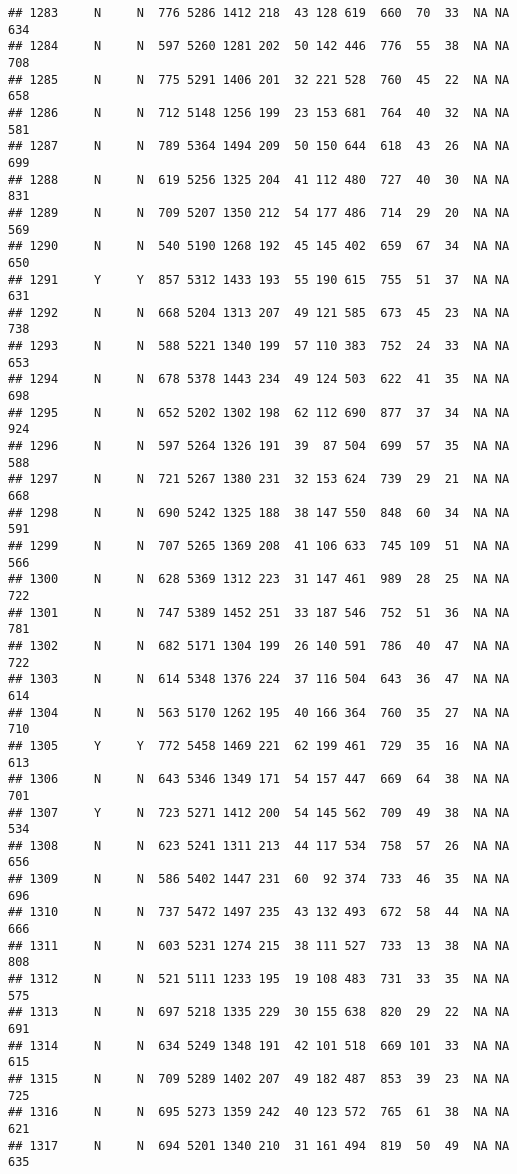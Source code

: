 \documentclass[]{article}
\begin{document}
\begin{verbatim}
## 1283     N     N  776 5286 1412 218  43 128 619  660  70  33  NA NA  634
## 1284     N     N  597 5260 1281 202  50 142 446  776  55  38  NA NA  708
## 1285     N     N  775 5291 1406 201  32 221 528  760  45  22  NA NA  658
## 1286     N     N  712 5148 1256 199  23 153 681  764  40  32  NA NA  581
## 1287     N     N  789 5364 1494 209  50 150 644  618  43  26  NA NA  699
## 1288     N     N  619 5256 1325 204  41 112 480  727  40  30  NA NA  831
## 1289     N     N  709 5207 1350 212  54 177 486  714  29  20  NA NA  569
## 1290     N     N  540 5190 1268 192  45 145 402  659  67  34  NA NA  650
## 1291     Y     Y  857 5312 1433 193  55 190 615  755  51  37  NA NA  631
## 1292     N     N  668 5204 1313 207  49 121 585  673  45  23  NA NA  738
## 1293     N     N  588 5221 1340 199  57 110 383  752  24  33  NA NA  653
## 1294     N     N  678 5378 1443 234  49 124 503  622  41  35  NA NA  698
## 1295     N     N  652 5202 1302 198  62 112 690  877  37  34  NA NA  924
## 1296     N     N  597 5264 1326 191  39  87 504  699  57  35  NA NA  588
## 1297     N     N  721 5267 1380 231  32 153 624  739  29  21  NA NA  668
## 1298     N     N  690 5242 1325 188  38 147 550  848  60  34  NA NA  591
## 1299     N     N  707 5265 1369 208  41 106 633  745 109  51  NA NA  566
## 1300     N     N  628 5369 1312 223  31 147 461  989  28  25  NA NA  722
## 1301     N     N  747 5389 1452 251  33 187 546  752  51  36  NA NA  781
## 1302     N     N  682 5171 1304 199  26 140 591  786  40  47  NA NA  722
## 1303     N     N  614 5348 1376 224  37 116 504  643  36  47  NA NA  614
## 1304     N     N  563 5170 1262 195  40 166 364  760  35  27  NA NA  710
## 1305     Y     Y  772 5458 1469 221  62 199 461  729  35  16  NA NA  613
## 1306     N     N  643 5346 1349 171  54 157 447  669  64  38  NA NA  701
## 1307     Y     N  723 5271 1412 200  54 145 562  709  49  38  NA NA  534
## 1308     N     N  623 5241 1311 213  44 117 534  758  57  26  NA NA  656
## 1309     N     N  586 5402 1447 231  60  92 374  733  46  35  NA NA  696
## 1310     N     N  737 5472 1497 235  43 132 493  672  58  44  NA NA  666
## 1311     N     N  603 5231 1274 215  38 111 527  733  13  38  NA NA  808
## 1312     N     N  521 5111 1233 195  19 108 483  731  33  35  NA NA  575
## 1313     N     N  697 5218 1335 229  30 155 638  820  29  22  NA NA  691
## 1314     N     N  634 5249 1348 191  42 101 518  669 101  33  NA NA  615
## 1315     N     N  709 5289 1402 207  49 182 487  853  39  23  NA NA  725
## 1316     N     N  695 5273 1359 242  40 123 572  765  61  38  NA NA  621
## 1317     N     N  694 5201 1340 210  31 161 494  819  50  49  NA NA  635

\end{verbatim}
\end{document}
